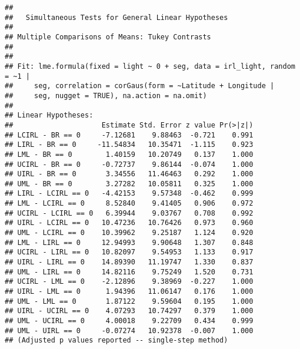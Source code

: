 \documentclass[letterpaper,12pt]{article}\usepackage[]{graphicx}\usepackage[]{color}
\makeatletter
\newenvironment{kframe}{%
 \def\at@end@of@kframe{}%
 \ifinner\ifhmode%
  \def\at@end@of@kframe{\end{minipage}}%
  \begin{minipage}{\columnwidth}%
 \fi\fi%
 \def\FrameCommand##1{\hskip\@totalleftmargin \hskip-\fboxsep
 \colorbox{shadecolor}{##1}\hskip-\fboxsep
     \hskip-\linewidth \hskip-\@totalleftmargin \hskip\columnwidth}%
 \MakeFramed {\advance\hsize-\width
   \@totalleftmargin\z@ \linewidth\hsize
   \@setminipage}}%
 {\par\unskip\endMakeFramed%
 \at@end@of@kframe}
\newenvironment{knitrout}{}{} %
\makeatother
\begin{document}
\begin{knitrout}
\begin{kframe}
\begin{alltt}
\end{alltt}
\begin{verbatim}
## 
## 	 Simultaneous Tests for General Linear Hypotheses
## 
## Multiple Comparisons of Means: Tukey Contrasts
## 
## 
## Fit: lme.formula(fixed = light ~ 0 + seg, data = irl_light, random = ~1 | 
##     seg, correlation = corGaus(form = ~Latitude + Longitude | 
##     seg, nugget = TRUE), na.action = na.omit)
## 
## Linear Hypotheses:
##                     Estimate Std. Error z value Pr(>|z|)
## LCIRL - BR == 0     -7.12681    9.88463  -0.721    0.991
## LIRL - BR == 0     -11.54834   10.35471  -1.115    0.923
## LML - BR == 0        1.40159   10.20749   0.137    1.000
## UCIRL - BR == 0     -0.72737    9.86144  -0.074    1.000
## UIRL - BR == 0       3.34556   11.46463   0.292    1.000
## UML - BR == 0        3.27282   10.05811   0.325    1.000
## LIRL - LCIRL == 0   -4.42153    9.57348  -0.462    0.999
## LML - LCIRL == 0     8.52840    9.41405   0.906    0.972
## UCIRL - LCIRL == 0   6.39944    9.03767   0.708    0.992
## UIRL - LCIRL == 0   10.47236   10.76426   0.973    0.960
## UML - LCIRL == 0    10.39962    9.25187   1.124    0.920
## LML - LIRL == 0     12.94993    9.90648   1.307    0.848
## UCIRL - LIRL == 0   10.82097    9.54953   1.133    0.917
## UIRL - LIRL == 0    14.89390   11.19747   1.330    0.837
## UML - LIRL == 0     14.82116    9.75249   1.520    0.731
## UCIRL - LML == 0    -2.12896    9.38969  -0.227    1.000
## UIRL - LML == 0      1.94396   11.06147   0.176    1.000
## UML - LML == 0       1.87122    9.59604   0.195    1.000
## UIRL - UCIRL == 0    4.07293   10.74297   0.379    1.000
## UML - UCIRL == 0     4.00018    9.22709   0.434    0.999
## UML - UIRL == 0     -0.07274   10.92378  -0.007    1.000
## (Adjusted p values reported -- single-step method)
\end{verbatim}
\end{kframe}
\end{knitrout}
\end{document}
